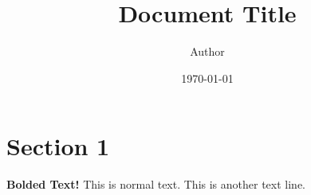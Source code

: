 \documentclass{article}
\title{Document Title}
\author{Author}
\date{\today}
\begin{document}
	\maketitle
	
	\section{Section 1}
	\textbf{Bolded Text!} This is normal text.
	This is another text line.
	
\end{document}
